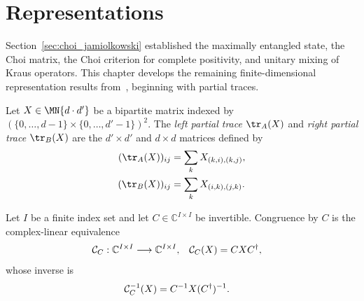 \section{Representations}
\label{sec:representations_infrastructure}

Section~\ref{sec:choi_jamiolkowski} established the maximally entangled state, the
Choi matrix, the Choi criterion for complete positivity, and unitary mixing of
Kraus operators. This chapter develops the remaining finite-dimensional
representation results from~\cite[Chapter~2]{Wolf2012Quantum}, beginning with
partial traces.

\begin{definition}\label{def:partial_trace}
    \leanok
    Let $X \in \MN{d \cdot d'}$ be a bipartite matrix indexed by
    $(\{0,\ldots,d-1\} \times \{0,\ldots,d'-1\})^2$.
    The \emph{left partial trace} $\tr_A(X)$ and
    \emph{right partial trace} $\tr_B(X)$ are the
    $d' \times d'$ and $d \times d$ matrices defined by
    \begin{align}
        (\tr_A(X))_{ij}
        &= \sum_{k} X_{(k,i),(k,j)},
        \notag\\
        (\tr_B(X))_{ij}
        &= \sum_{k} X_{(i,k),(j,k)}.
        \notag
    \end{align}
\end{definition}

\begin{definition}
    \label{def:invertible_matrix_congruence}
    \leanok
    Let $I$ be a finite index set and let $C\in\mathbb C^{I\times I}$ be
    invertible. Congruence by $C$ is the complex-linear equivalence
    \begin{align}
        \mathcal C_C:\mathbb C^{I\times I}&\longrightarrow
            \mathbb C^{I\times I},
        &
        \mathcal C_C(X)&=CXC^\dagger,
        \notag
    \end{align}
    whose inverse is
    \begin{align}
        \mathcal C_C^{-1}(X)
        &=C^{-1}X(C^\dagger)^{-1}.
        \notag
    \end{align}
\end{definition}

